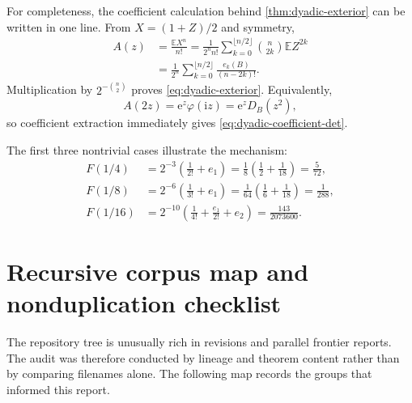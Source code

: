 \documentclass[11pt,oneside]{article}
\theoremstyle{definition}
\newcommand{\e}{\mathrm e}
\newcommand{\ii}{\mathrm i}
\newcommand{\E}{\mathbb E}
\newcommand{\phiF}{\varphi}
\begin{document}
For completeness, the coefficient calculation behind \cref{thm:dyadic-exterior} can
be written in one line.  From \(X=(1+Z)/2\) and symmetry,
\begin{align*}
 [z^n]A(z)
 &=\frac{\E X^n}{n!}
 =\frac1{2^nn!}\sum_{k=0}^{\lfloor n/2\rfloor}
   \binom n{2k}\E Z^{2k}\\
 &=\frac1{2^n}\sum_{k=0}^{\lfloor n/2\rfloor}
   \frac{e_k(B)}{(n-2k)!}.
\end{align*}
Multiplication by \(2^{-\binom n2}\) proves \eqref{eq:dyadic-exterior}.  Equivalently,
\begin{equation}
 A(2z)=\e^z\phiF(\ii z)=\e^zD_B(z^2),
 \label{eq:A2z-det}
\end{equation}
so coefficient extraction immediately gives \eqref{eq:dyadic-coefficient-det}.

The first three nontrivial cases illustrate the mechanism:
\begin{align}
 F(1/4)
 &=2^{-3}\left(\frac1{2!}+e_1\right)
 =\frac18\left(\frac12+\frac1{18}\right)=\frac5{72},
 \label{eq:case-n2}\\
 F(1/8)
 &=2^{-6}\left(\frac1{3!}+e_1\right)
 =\frac1{64}\left(\frac16+\frac1{18}\right)=\frac1{288},
 \label{eq:case-n3}\\
 F(1/16)
 &=2^{-10}\left(\frac1{4!}+\frac{e_1}{2!}+e_2\right)
 =\frac{143}{2073600}.
 \label{eq:case-n4}
\end{align}

\section{Recursive corpus map and nonduplication checklist}
\label{app:corpus}

The repository tree is unusually rich in revisions and parallel frontier reports.  The
audit was therefore conducted by lineage and theorem content rather than by comparing
filenames alone.  The following map records the groups that informed this report.
\end{document}
